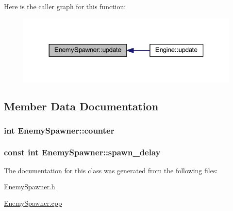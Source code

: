 Here is the caller graph for this function\+:\nopagebreak
\begin{figure}[H]
\begin{center}
\leavevmode
\includegraphics[width=318pt]{class_enemy_spawner_a1b00731679380c088027072b11583d6c_icgraph}
\end{center}
\end{figure}




\subsection{Member Data Documentation}
\hypertarget{class_enemy_spawner_a10072a5aab9a1d055df222ee0ef3fe6e}{}
\subsubsection[{counter}]{\setlength{\rightskip}{0pt plus 5cm}int Enemy\+Spawner\+::counter\hspace{0.3cm}{\ttfamily [protected]}}\label{class_enemy_spawner_a10072a5aab9a1d055df222ee0ef3fe6e}
\hypertarget{class_enemy_spawner_a925cbf3cbaadaf7b376ef6aadc955d7f}{}
\subsubsection[{spawn\+\_\+delay}]{\setlength{\rightskip}{0pt plus 5cm}const int Enemy\+Spawner\+::spawn\+\_\+delay\hspace{0.3cm}{\ttfamily [protected]}}\label{class_enemy_spawner_a925cbf3cbaadaf7b376ef6aadc955d7f}


The documentation for this class was generated from the following files\+:\begin{DoxyCompactItemize}
\item 
\hyperlink{_enemy_spawner_8h}{Enemy\+Spawner.\+h}\item 
\hyperlink{_enemy_spawner_8cpp}{Enemy\+Spawner.\+cpp}\end{DoxyCompactItemize}
